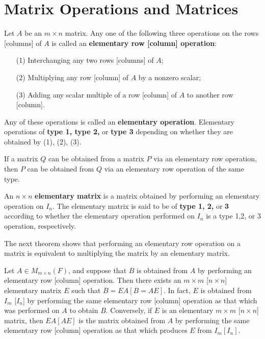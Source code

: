 \section{Matrix Operations and Matrices}

\begin{definition}
    Let \( A  \) be an \( m \times n  \) matrix. Any one of the following three operations on the rows [columns] of \( A  \) is called an \textbf{elementary row [column] operation}:
    \begin{enumerate}
        \item[(1)] Interchanging any two rows [columns] of \( A \);
        \item[(2)] Multiplying any row [column] of \( A  \) by a nonzero scalar;
        \item[(3)] Adding any scalar multiple of a row [column] of \( A  \) to another row [column].
    \end{enumerate}
    Any of these operations is called an \textbf{elementary operation}. Elementary operations of \textbf{type 1, type 2,} or \textbf{type 3} depending on whether they are obtained by (1), (2), (3).
\end{definition}

If a matrix \( Q  \) can be obtained from a matrix \( P  \) via an elementary row operation, then \( P  \) can be obtained from \( Q  \) via an elementary row operation of the same type.

\begin{definition}
    An \( n \times n  \) \textbf{elementary matrix} is a matrix obtained by performing an elementary operation on \( {I}_{n} \). The elementary matrix is said to be of \textbf{type 1, 2,} or \textbf{3} according to whether the elementary operation performed on \( {I}_{n} \) is a type 1,2, or 3 operation, respectively.
\end{definition}

The next theorem shows that performing an elementary row operation on a matrix is equivalent to multiplying the matrix by an elementary matrix.

\begin{theorem}\label{Theorem 3.1}
    Let \( A \in {M}_{m \times n}(F)  \), and suppose that \( B  \) is obtained from \( A  \) by performing an elementary row [column] operation. Then there exists an \( m \times m  \) [\( n \times n \)] elementary matrix \( E  \) such that \(  B = EA [B = AE] \). In fact, \( E  \) is obtained from \( {I}_{m}  \) [\( {I}_{n} \)] by performing the same elementary row [column] operation as that which was performed on \( A  \) to obtain \( B \). Conversely, if \( E \) is an elementary \( m \times m  \) [\( n \times n \)] matrix, then \( EA [AE]  \) is the matrix obtained from \( A  \) by performing the same elementary row [column] operation as that which produces \( E  \) from \( {I}_{m} [{I}_{n}]  \). 
\end{theorem}

